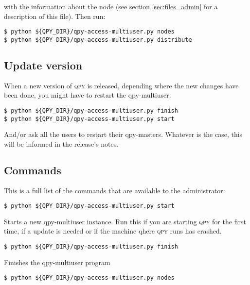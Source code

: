 \documentclass[a4paper,12pt]{article}
\newcommand{\qpy}{\textsc{qpy}}
\begin{document}
with the information about the node (see section \ref{sec:files_admin} for a description of this file).
Then run:

\begin{verbatim}
$ python ${QPY_DIR}/qpy-access-multiuser.py nodes
$ python ${QPY_DIR}/qpy-access-multiuser.py distribute
\end{verbatim}




\subsection{Update version}

When a new version of \qpy{} is released, depending where the new changes have been done, you might have to restart the qpy-multiuser:

\begin{verbatim}
$ python ${QPY_DIR}/qpy-access-multiuser.py finish
$ python ${QPY_DIR}/qpy-access-multiuser.py start
\end{verbatim}

And/or ask all the users to restart their qpy-masters.
Whatever is the case, this will be informed in the release's notes.



\subsection{Commands}

This is a full list of the commands that are available to the administrator:

\begin{lstlisting}[style=BashStyle]
$ python ${QPY_DIR}/qpy-access-multiuser.py start
\end{lstlisting}

Starts a new qpy-multiuser instance.
Run this if you are starting \qpy{} for the first time, if a update is needed or if the machine qhere \qpy{} runs has crashed.

\begin{lstlisting}[style=BashStyle]
$ python ${QPY_DIR}/qpy-access-multiuser.py finish
\end{lstlisting}

Finishes the qpy-multiuser program

\begin{lstlisting}[style=BashStyle]
$ python ${QPY_DIR}/qpy-access-multiuser.py nodes
\end{lstlisting}
\end{document}
